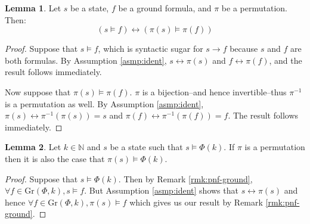 \documentclass[12pt]{article}
\theoremstyle{definition}
\newtheorem{lemma}{Lemma}
\theoremstyle{remark}
\newcommand{\gr}{\text{Gr}}
\begin{document}
\begin{lemma}
  \label{lem:state-sat-perm}
  Let $s$ be a state, $f$ be a ground formula, and $\pi$ be a permutation.  Then:
  $$(s \models f) \leftrightarrow (\pi(s) \models \pi(f))$$
\end{lemma}
\begin{proof}
  Suppose that $s \models f$, which is syntactic sugar for $s \rightarrow f$ because $s$ and $f$ are both formulas.  By Assumption \ref{asmp:ident}, $s \leftrightarrow \pi(s)$ and $f \leftrightarrow \pi(f)$, and the result follows immediately.

  Now suppose that $\pi(s) \models \pi(f)$.  $\pi$ is a bijection--and hence invertible--thus $\pi^{-1}$ is a permutation as well.  By Assumption \ref{asmp:ident}, $\pi(s) \leftrightarrow \pi^{-1}(\pi(s)) = s$ and $\pi(f) \leftrightarrow \pi^{-1}(\pi(f)) = f$.  The result follows immediately.
\end{proof}

\begin{lemma}
  \label{lem:state-perm}
  Let $k \in \mathbb{N}$ and $s$ be a state such that $s \models \Phi(k)$.  If $\pi$ is a permutation then it is also the case that $\pi(s) \models \Phi(k)$.
\end{lemma}
\begin{proof}
  Suppose that $s \models \Phi(k)$.  Then by Remark \ref{rmk:pnf-ground}, $\forall f \in \gr(\Phi,k), s \models f$.  But Assumption \ref{asmp:ident} shows that $s \leftrightarrow \pi(s)$ and hence $\forall f \in \gr(\Phi,k), \pi(s) \models f$ which gives us our result by Remark \ref{rmk:pnf-ground}.
\end{proof}
\end{document}
